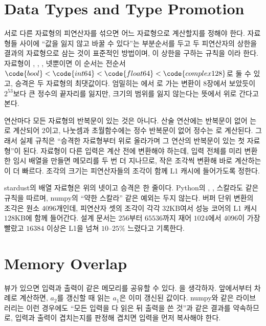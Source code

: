 \section{Data Types and Type Promotion}
\label{sec:promotion}

서로 다른 자료형의 피연산자를 섞으면 어느 자료형으로 계산할지를 정해야 한다. 자료형들 사이에 ``값을 잃지 않고 바꿀 수 있다''는 부분순서를 두고 두 피연산자의 상한을 결과의 자료형으로 삼는 것이 표준적인 방법이며, 이 상한을 구하는 규칙을 이라 한다. 자료형이 , , ,  넷뿐이면 이 순서는 전순서 $\code{bool}<\code{int64}<\code{float64}<\code{complex128}$로 둘 수 있고, 승격은 두 자료형의 최댓값이다. 엄밀히는 에서 로 가는 변환이 8장에서 보았듯이 $2^{53}$보다 큰 정수의 끝자리를 잃지만, 크기의 범위를 잃지 않는다는 뜻에서 위로 간다고 본다.

연산마다 모든 자료형의 반복문이 있는 것은 아니다. 산술 연산에는  반복문이 없어 는 로 계산되어 $2$이고, 나눗셈과 초월함수에는 정수 반복문이 없어 정수는 로 계산된다. 그래서 실제 규칙은 ``승격한 자료형부터 위로 올라가며 그 연산의 반복문이 있는 첫 자료형''이 된다. 자료형이 다른 입력은 계산 전에 변환해야 하는데, 입력 전체를 미리 변환한 임시 배열을 만들면 메모리를 두 번 더 지나므로, 작은 조각씩 변환해 바로 계산하는 이 더 빠르다. 조각의 크기는 피연산자들의 조각이 함께 L1 캐시에 들어가도록 정한다.

\begin{instardust}
stardust의 배열 자료형은 위의 넷이고 승격은  한 줄이다. Python의 , ,  스칼라도 같은 규칙을 따르며, numpy의 ``약한 스칼라'' 같은 예외는 두지 않는다. 버퍼 단위 변환의 조각은 원소 $4096$개인데, 피연산자 셋의 조각이 각각 $32$KB여서 성능 코어의 L1 캐시 $128$KB에 함께 들어간다. 설계 문서는 $256$부터 $65536$까지 재어 $1024$에서 $4096$이 가장 빨랐고 $16384$ 이상은 L1을 넘쳐 $10$--$25\%$ 느렸다고 기록한다.
\end{instardust}

\section{Memory Overlap}
\label{sec:overlap}

뷰가 있으면 입력과 출력이 같은 메모리를 공유할 수 있다. 을 생각하자. 앞에서부터 차례로 계산하면, $a_2$를 갱신할 때 읽는 $a_1$은 이미 갱신된 값이다. numpy와 같은 라이브러리는 이런 경우에도 ``모든 입력을 다 읽은 뒤 출력을 쓴 것''과 같은 결과를 약속하므로, 입력과 출력이 겹치는지를 판정해 겹치면 입력을 먼저 복사해야 한다.

